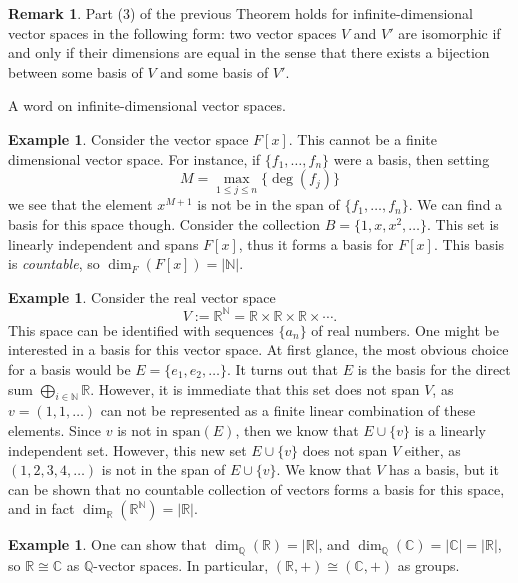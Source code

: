 \documentclass[12pt]{report}
\numberwithin{equation}{section}
\numberwithin{theorem}{chapter}
\theoremstyle{definition}
\newtheorem{example}[theorem]{Example}
\newtheorem*{basic properties}{Basic Properties}
\newtheorem*{Important Remark}{Important Remark}
\newtheorem{remark}[theorem]{Remark}
\newcommand{\N}{\mathbb{N}}
\begin{document}
\begin{remark}
Part (3) of the previous Theorem holds for infinite-dimensional vector spaces in the following form: two vector spaces $V$ and $V'$ are isomorphic if and only if their dimensions are equal in the sense that there exists a bijection between some basis of $V$ and some basis of $V'$.
\end{remark}

A word on infinite-dimensional vector spaces.
 
\begin{example}\label{F[x] infinite dim}
Consider the vector space $F[x]$. This cannot be a finite dimensional vector space. For instance, if $\{f_1 , \dots , f_n\}$ were a basis, then setting
$$M = \max_{1 \leqslant j \leqslant n}\{ \deg(f_j)\}$$
we see that the element $x^{M+1}$ is not be in the span of $\{f_1 , \dots , f_n\}$. We can find a basis for this space though. Consider the collection $B = \{1, x, x^2 , \ldots \}$. This set is linearly independent and spans $F[x]$, thus it forms a basis for $F[x]$. This basis is {\em countable}, so $\dim_F(F[x])= |\N|$.
\end{example}

\begin{example}
Consider the real vector space 
$$V := \mathbb{R}^\N = \mathbb{R}\times \mathbb{R}\times \mathbb{R} \times \cdots.$$ 
This space can be identified with sequences $\{a_n\}$ of real numbers. One might be interested in a basis for this vector space. At first glance, the most obvious choice for a basis would be $E = \{e_1,e_2,\ldots\}$. It turns out that $E$ is the basis for the direct sum $\bigoplus_{i\in \N}\mathbb{R}$. However, it is immediate that this set does not span $V$, as $v = (1,1,\ldots)$ can not be represented as a finite linear combination of these elements. Since $v$ is not in $\mathrm{span}(E)$, then we know that $E \cup \{v\}$ is a linearly independent set. However, this new set $E \cup \{v\}$ does not span $V$ either, as $(1, 2, 3, 4, \ldots)$ is not in the span of $E \cup \{v\}$. We know that $V$ has a basis, but it can be shown that no countable collection of vectors forms a basis for this space, and in fact $\dim_\mathbb{R} (\mathbb{R}^\N) =|\mathbb{R}|$. 
\end{example}

\begin{example}
One can show that $\dim_{\mathbb{Q}}(\mathbb{R})=|\mathbb{R}|$, and $\dim_{\mathbb{Q}}(\mathbb{C})=|\mathbb{C}| = |\mathbb{R}|$, so $\mathbb{R}\cong \mathbb{C}$ as $\mathbb{Q}$-vector spaces. In particular,  $(\mathbb{R},+)\cong (\mathbb{C},+)$ as groups.
\end{example}
\end{document}
